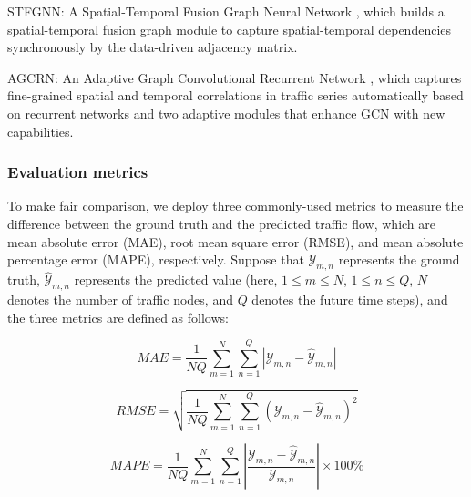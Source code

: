 STFGNN: A Spatial-Temporal Fusion Graph Neural Network \cite{mengzhang2020spatial}, which builds a spatial-temporal fusion graph module to capture spatial-temporal dependencies synchronously by the data-driven adjacency matrix.

AGCRN: An Adaptive Graph Convolutional Recurrent Network \cite{bai2020adaptive}, which captures fine-grained spatial and temporal correlations in traffic series automatically based on recurrent networks and two adaptive modules that enhance GCN with new capabilities. 

\subsubsection{Evaluation metrics}
To make fair comparison, we deploy three commonly-used metrics to measure the difference between the ground truth and the predicted traffic flow, which are mean absolute error (MAE), root mean square error (RMSE), and mean absolute percentage error (MAPE), respectively. Suppose that $\mathcal{Y}_{m,n}$ represents the ground truth, $\hat{\mathcal{Y}}_{m,n}$ represents the predicted value (here, $1 \leq m \leq N$, $1 \leq n \leq Q$, $N$ denotes the number of traffic nodes, and $Q$ denotes the future time steps), and the three metrics are defined as follows:

\begin{equation}
    \label{eqn:mae}
    MAE = \frac{1}{NQ} \sum\limits_{m=1}^{N}\sum\limits_{n=1}^{Q} \left | \mathcal{Y}_{m,n} - \hat{\mathcal{Y}}_{m,n} \right |
\end{equation}

\begin{equation}
    \label{eqn:rmse}
    RMSE = \sqrt{\frac{1}{NQ} \sum\limits_{m=1}^{N}\sum\limits_{n=1}^{Q} \left ( \mathcal{Y}_{m,n} - \hat{\mathcal{Y}}_{m,n} \right )^2}
\end{equation}

\begin{equation}
    \label{eqn:mape}
    MAPE = \frac{1}{NQ} \sum\limits_{m=1}^{N}\sum\limits_{n=1}^{Q} \left | \frac{ \mathcal{Y}_{m,n} - \hat{\mathcal{Y}}_{m,n}}{\mathcal{Y}_{m,n}} \right | \times 100 \%
\end{equation}

